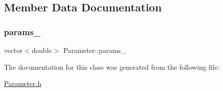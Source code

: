 \subsection{Member Data Documentation}
\hypertarget{class_parameter_ab7e9f6b7b261380449ff0eca797e48e7}{}\label{class_parameter_ab7e9f6b7b261380449ff0eca797e48e7} 
\subsubsection{\texorpdfstring{params\+\_\+}{params\_}}
{\footnotesize\ttfamily vector$<$double$>$ Parameter\+::params\+\_\+\hspace{0.3cm}{\ttfamily [protected]}}



The documentation for this class was generated from the following file\+:\begin{DoxyCompactItemize}
\item 
\hyperlink{_parameter_8h}{Parameter.\+h}\end{DoxyCompactItemize}
